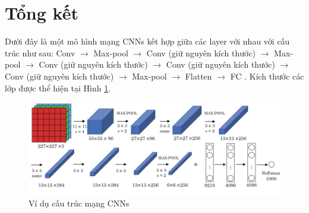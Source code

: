 \section{Tổng kết}
Dưới đây là một mô hình mạng CNNs kết hợp giữa các layer với nhau với cấu trúc như sau: Conv $\to$ Max-pool $\to$ Conv (giữ nguyên kích thước) $\to$ Max-pool $\to$ Conv (giữ nguyên kích thước) $\to$ Conv (giữ nguyên kích thước) $\to$ Conv (giữ nguyên kích thước) $\to$ Max-pool $\to$ Flatten $\to$ FC . Kích thước các lớp được thể hiện tại Hình \ref{fig:CNN}.
\begin{center}
\begin{figure}[H]
	\begin{center}
		\includegraphics[scale=0.5]{chap4/image/CNN.png}
	\end{center}
	\caption{Ví dụ cấu trúc mạng CNNs}
	\label{fig:CNN}
\end{figure}
\end{center}
